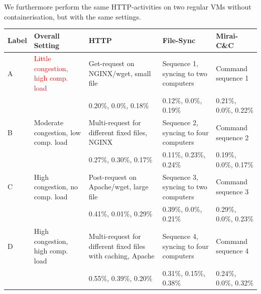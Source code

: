 \documentclass[sigconf]{acmart}
\begin{document}
We furthermore perform the same HTTP-activities on two regular VMs without containerisation, but with the same settings.


\begin{table}
\centering
\begin{tabular}{p{0.8cm}|p{2.5cm}|p{2.7cm}|p{2.7cm}|p{2.7cm}}
Label &Overall Setting&HTTP&File-Sync & Mirai-C\&C\\ \hline
A&\textcolor{red}{Little congestion, high comp. load} & Get-request on NGINX/wget, small file & Sequence 1,  syncing to two computers & Command sequence 1 \\ \hline
 &&\footnotesize \textcolor{myred}{0.20\%}, \textcolor{mygreen}{0.0\%}, \textcolor{myblue}{0.18\%}&
 \footnotesize \textcolor{myred}{0.12\%}, \textcolor{mygreen}{0.0\%}, \textcolor{myblue}{0.19\%}&
 \footnotesize \textcolor{myred}{0.21\%}, \textcolor{mygreen}{0.0\%}, \textcolor{myblue}{0.22\%}\\ \hline \hline
B& Moderate congestion, low comp. load &Multi-request for different fixed files, NGINX & Sequence 2,  syncing to four computers & Command sequence 2\\ \hline
 &&\footnotesize \textcolor{myred}{0.27\%}, \textcolor{mygreen}{0.30\%}, \textcolor{myblue}{0.17\%}&
\footnotesize \textcolor{myred}{0.11\%}, \textcolor{mygreen}{0.23\%}, \textcolor{myblue}{0.24\%}&
\footnotesize \textcolor{myred}{0.19\%}, \textcolor{mygreen}{0.0\%}, \textcolor{myblue}{0.17\%}\\ \hline \hline
C& High congestion, no comp. load & Post-request on Apache/wget, large file &Sequence 3,  syncing to two computers & Command sequence 3\\ \hline
 &&\footnotesize \textcolor{myred}{0.41\%}, \textcolor{mygreen}{0.01\%}, \textcolor{myblue}{0.29\%}&
 \footnotesize \textcolor{myred}{0.39\%}, \textcolor{mygreen}{0.0\%}, \textcolor{myblue}{0.21\%}&
 \footnotesize \textcolor{myred}{0.29\%}, \textcolor{mygreen}{0.0\%}, \textcolor{myblue}{0.23\%}\\ \hline \hline
D& High congestion, high comp. load & Multi-request for different fixed files with caching, Apache & Sequence 4,  syncing to four computers & Command sequence 4\\ \hline
 &&\footnotesize \textcolor{myred}{0.55\%}, \textcolor{mygreen}{0.39\%}, \textcolor{myblue}{0.20\%}&
 \footnotesize \textcolor{myred}{0.31\%}, \textcolor{mygreen}{0.15\%}, \textcolor{myblue}{0.38\%}&
 \footnotesize \textcolor{myred}{0.24\%}, \textcolor{mygreen}{0.0\%}, \textcolor{myblue}{0.32\%}\\ \hline \hline

\end{tabular}
\end{table}
\end{document}
